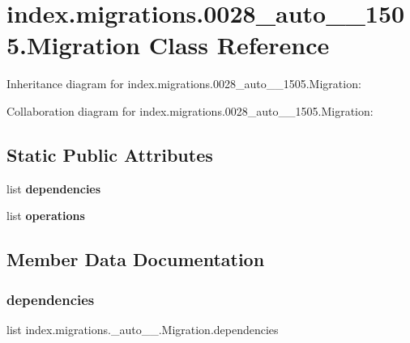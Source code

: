 \hypertarget{classindex_1_1migrations_1_10028__auto__20171028__1505_1_1Migration}{}\section{index.\+migrations.0028\+\_\+auto\+\_\+\_\+1505.Migration Class Reference}
\label{classindex_1_1migrations_1_10028__auto__20171028__1505_1_1Migration}


Inheritance diagram for index.\+migrations.0028\+\_\+auto\+\_\+\_\+1505.Migration\+:


Collaboration diagram for index.\+migrations.0028\+\_\+auto\+\_\+\_\+1505.Migration\+:
\subsection*{Static Public Attributes}
\begin{DoxyCompactItemize}
\item 
list {\bfseries dependencies}
\item 
\mbox{\label{classindex_1_1migrations_1_10028__auto__20171028__1505_1_1Migration_a79269493cb582fda8d4420f2cbe19903}} 
list {\bfseries operations}
\end{DoxyCompactItemize}


\subsection{Member Data Documentation}
\mbox{\label{classindex_1_1migrations_1_10028__auto__20171028__1505_1_1Migration_a7d7f861f4be7452be1acfa18c72e3f1e}} 
\subsubsection{\texorpdfstring{dependencies}{dependencies}}
{\footnotesize\ttfamily list index.\+migrations.\+\_\+auto\+\_\+\_.\+Migration.\+dependencies\hspace{0.3cm}{\ttfamily [static]}}

